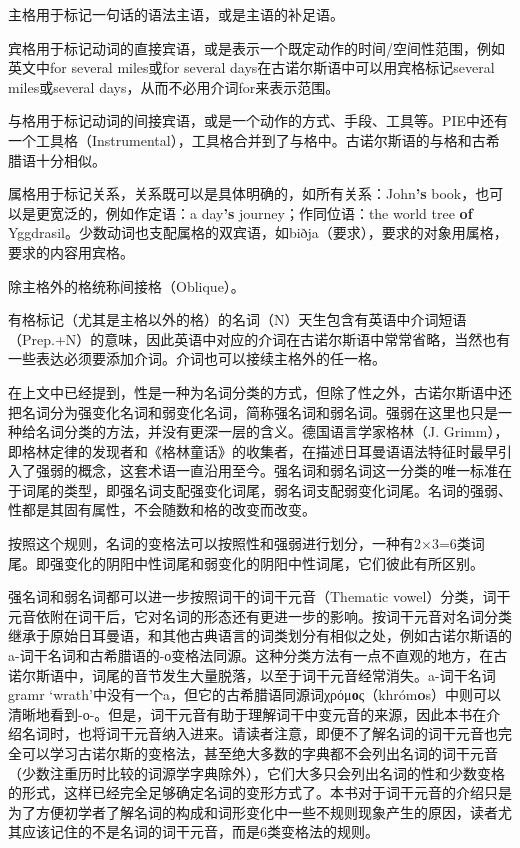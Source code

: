 主格用于标记一句话的语法主语，或是主语的补足语。

宾格用于标记动词的直接宾语，或是表示一个既定动作的时间/空间性范围，例如英文中for
several miles‌或for several days在古诺尔斯语中可以用宾格标记several
miles或several days，从而不必用介词for来表示范围。

与格用于标记动词的间接宾语，或是一个动作的方式、手段、工具等。PIE中还有一个工具格（Instrumental），工具格合并到了与格中。古诺尔斯语的与格和古希腊语十分相似。

属格用于标记关系，关系既可以是具体明确的，如所有关系：John\textbf{'s}
book，也可以是更宽泛的，例如作定语：a day\textbf{‌'s}
journey；作同位语：the world tree \textbf{of}
Yggdrasil。少数动词也支配属格的双宾语，如biðja（要求），要求的对象用属格，要求的内容用宾格。

除主格外的格统称间接格（Oblique）。

有格标记（尤其是主格以外的格）的名词（N）天生包含有英语中介词短语（Prep.+N）的意味，因此英语中对应的介词在古诺尔斯语中常常省略，当然也有一些表达必须要添加介词。介词也可以接续主格外的任一格。

在上文中已经提到，性是一种为名词分类的方式，但除了性之外，古诺尔斯语中还把名词分为强变化名词和弱变化名词，简称强名词和弱名词。强弱在这里也只是一种给名词分类的方法，并没有更深一层的含义。德国语言学家格林（J.
Grimm），即格林定律的发现者和《格林童话》的收集者，在描述日耳曼语语法特征时最早引入了强弱的概念，这套术语一直沿用至今。强名词和弱名词这一分类的唯一标准在于词尾的类型，即强名词支配强变化词尾，弱名词支配弱变化词尾。名词的强弱、性都是其固有属性，不会随数和格的改变而改变。

按照这个规则，名词的变格法可以按照性和强弱进行划分，一种有2×3=6类词尾。即强变化的阴阳中性词尾和弱变化的阴阳中性词尾，它们彼此有所区别。

强名词和弱名词都可以进一步按照词干的词干元音（Thematic
vowel）分类，词干元音依附在词干后，它对名词的形态还有更进一步的影响。按词干元音对名词分类继承于原始日耳曼语，和其他古典语言的词类划分有相似之处，例如古诺尔斯语的a-词干名词和古希腊语的-ο变格法同源。这种分类方法有一点不直观的地方，在古诺尔斯语中，词尾的音节发生大量脱落，以至于词干元音经常消失。a-词干名词gramr
`wrath'中没有一个a，但它的古希腊语同源词χρόμ\textbf{ο}ς（khróm\textbf{o}s）中则可以清晰地看到-ο-。但是，词干元音有助于理解词干中变元音的来源，因此本书在介绍名词时，也将词干元音纳入进来。请读者注意，即便不了解名词的词干元音也完全可以学习古诺尔斯的变格法，甚至绝大多数的字典都不会列出名词的词干元音（少数注重历时比较的词源学字典除外），它们大多只会列出名词的性和少数变格的形式，这样已经完全足够确定名词的变形方式了。本书对于词干元音的介绍只是为了方便初学者了解名词的构成和词形变化中一些不规则现象产生的原因，读者尤其应该记住的不是名词的词干元音，而是6类变格法的规则。

